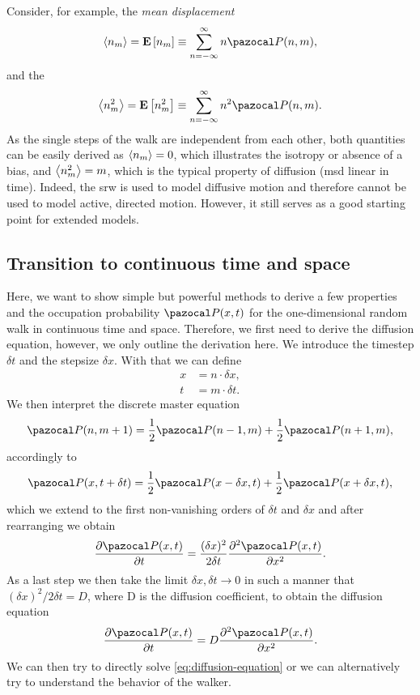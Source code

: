 Consider, for example, the \textit{mean displacement} 
\begin{equation*}
 \avg{n_m} = \E{n_m} \equiv \sum\limits_{n=-\infty}^\infty n \P(n,m),
\end{equation*}
and the 
\begin{equation*}
 \avg{n_m^2} = \E{n_m^2} \equiv \sum\limits_{n=-\infty}^\infty n^2 \P(n,m).
\end{equation*}
As the single steps of the walk are independent from each other, both quantities can be easily derived as $\left<n_m\right> = 0$, which illustrates the isotropy or absence of a bias, and $\left<n_m^2\right> = m$, which is the typical property of diffusion (\ac{msd} linear in time). Indeed, the \ac{srw} is used to model diffusive motion \cite{codling:2008} and therefore cannot be used to model active, directed motion. However, it still serves as a good starting point for extended models.

\subsection*{Transition to continuous time and space}
Here, we want to show simple but powerful methods to derive a few properties and the occupation probability $\P(x,t)$ for the one-dimensional random walk in continuous time and space. Therefore, we first need to derive the diffusion equation, however, we only outline the derivation here. We introduce the timestep $\delta t$ and the stepsize $\delta x$. With that we can define
\begin{equation*}
 \begin{aligned}
  x &= n \cdot \delta x,
  \\
  t &= m \cdot \delta t.
 \end{aligned}
\end{equation*}
We then interpret the discrete master equation
\begin{equation*}
 \P(n, m+1) = \frac{1}{2} \P(n-1, m) + \frac{1}{2} \P(n+1, m),
\end{equation*}
accordingly to
\begin{equation*}
 \P(x, t+\delta t) = \frac{1}{2} \P(x-\delta x, t) + \frac{1}{2} \P(x+\delta x, t),
\end{equation*}
which we extend to the first non-vanishing orders of $\delta t$ and $\delta x$ and after rearranging we obtain
\begin{equation*}
 \frac{\partial \P(x, t)}{\partial t} = \dfrac{(\delta x)^2}{2 \delta t}\frac{\partial^2 \P(x, t)}{\partial x^2}.
\end{equation*}
As a last step we then take the limit $\delta x, \delta t \rightarrow 0$ in such a manner that $(\delta x)^2 / 2 \delta t = D$, where D is the diffusion coefficient, to obtain the diffusion equation
\begin{equation}\label{eq:diffusion-equation}
 \frac{\partial \P(x, t)}{\partial t} = D \frac{\partial^2 \P(x, t)}{\partial x^2}.
\end{equation}
We can then try to directly solve \autoref{eq:diffusion-equation} or we can alternatively try to understand the behavior of the walker.

